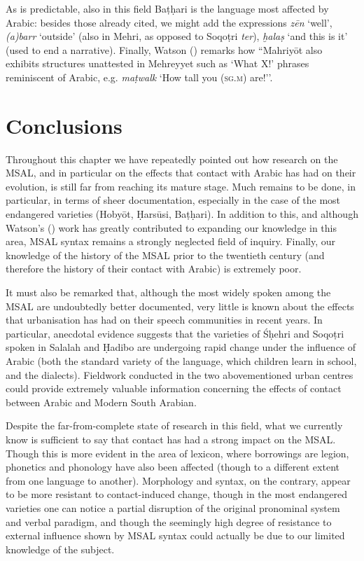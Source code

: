 \documentclass[output=paper]{langsci/langscibook}
\begin{document}
As is predictable, also in this field Baṭḥari is the language most affected by Arabic: besides those already cited, we might add the expressions \textit{zēn} ‘well’, \textit{(a)barr} ‘outside’ (also in Mehri, as opposed to Soqoṭri \textit{ter}), \textit{ḫalaṣ} ‘and this is it’ (used to end a narrative). Finally, Watson (\citeyear[3]{Watson2012}) remarks how ``Mahriyōt also exhibits structures unattested in Mehreyyet such as ‘What X!’ phrases reminiscent of Arabic, e.g. \textit{maṭwalk} ‘How tall you (\textsc{sg.m}) are!’’.

\section{Conclusions}\label{sec:4}

Throughout this chapter we have repeatedly pointed out how research on the MSAL, and in particular on the effects that contact with Arabic has had on their evolution, is still far from reaching its mature stage. Much remains to be done, in particular, in terms of sheer documentation, especially in the case of the most endangered varieties (Hobyōt, Ḥarsūsi, Baṭḥari). In addition to this, and although Watson’s (\citeyear{Watson2012}) work has greatly contributed to expanding our knowledge in this area, MSAL syntax remains a strongly neglected field of inquiry. Finally, our knowledge of the history of the MSAL prior to the twentieth century (and therefore the history of their contact with Arabic) is extremely poor. 

It must also be remarked that, although the most widely spoken among the MSAL are undoubtedly better documented, very little is known about the effects that urbanisation has had on their speech communities in recent years. In particular, anecdotal evidence suggests that the varieties of Śḥehri and Soqoṭri spoken in Salalah and Ḥadibo are undergoing rapid change under the influence of Arabic (both the standard variety of the language, which children learn in school, and the dialects). Fieldwork conducted in the two abovementioned urban centres could provide extremely valuable information concerning the effects of contact between Arabic and Modern South Arabian.

Despite the far-from-complete state of research in this field, what we currently know is sufficient to say that contact has had a strong impact on the MSAL. Though this is more evident in the area of lexicon, where borrowings are legion, phonetics and phonology have also been affected (though to a different extent from one language to another). Morphology and syntax, on the contrary, appear to be more resistant to contact-induced change, though in the most endangered varieties one can notice a partial disruption of the original pronominal system and verbal paradigm, and though the seemingly high degree of resistance to external influence shown by MSAL syntax could actually be due to our limited knowledge of the subject.
\end{document}

